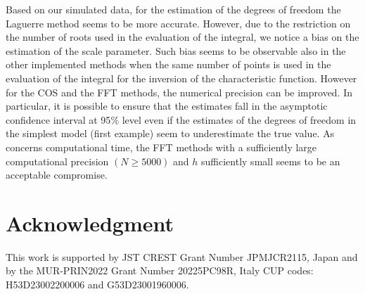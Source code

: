 Based on our simulated data, for the estimation of the degrees of freedom the Laguerre method seems to be more accurate. However, due to the restriction on the number of roots used in the evaluation of the integral, we notice a bias on the estimation of the scale parameter. Such bias seems to be observable also in the other implemented methods when the same number of points is used in the evaluation of the integral for the inversion of the characteristic function. However for the COS and the FFT methods, the numerical precision can be improved. In particular, it is possible to ensure that the estimates fall in the asymptotic confidence interval at 95\(\%\) level even if the estimates of the degrees of freedom in the simplest model (first example) seem to underestimate the true value. As concerns computational time, the FFT methods with a sufficiently large computational precision \((N\geq 5000)\) and \(h\) sufficiently small seems to be an acceptable compromise.

\section*{Acknowledgment}\label{acknowledgment}

This work is supported by JST CREST Grant Number JPMJCR2115, Japan and by the MUR-PRIN2022 Grant Number 20225PC98R, Italy CUP codes: H53D23002200006 and G53D23001960006.



\address{%
Hiroki Masuda\\
The University of Tokyo\\%
Graduate School of Mathematical Sciences,\\ 3-8-1 Komaba Meguro-ku Tokyo 153-8914, Japan\\
%
\url{https://www.ms.u-tokyo.ac.jp/teacher_e/masuda_e.html}\\%
\textit{ORCiD: \href{https://orcid.org/0000-0002-5553-9201}{0000-0002-5553-9201}}\\%
\href{mailto:hmasuda@ms.u-tokyo.ac.jp}{\nolinkurl{hmasuda@ms.u-tokyo.ac.jp}}%
}

\address{%
Lorenzo Mercuri\\
University of Milan\\%
Department of Economics, Management and Quantitative Methods\\ Via Del Conservatorio Milano 7, Italy.\\
%
\url{https://www.unimi.it/en/ugov/person/lorenzo-mercuri}\\%
\textit{ORCiD: \href{https://orcid.org/0000-0003-0490-2952}{0000-0003-0490-2952}}\\%
\href{mailto:lorenzo.mercuri@unimi.it}{\nolinkurl{lorenzo.mercuri@unimi.it}}%
}

